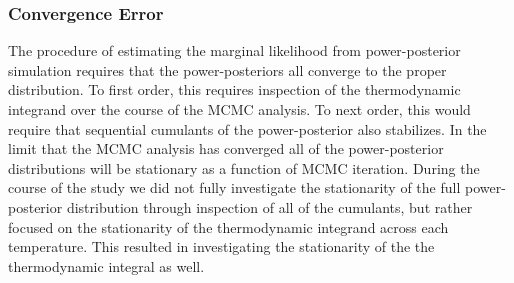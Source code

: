 \subsubsection{Convergence Error}
The procedure of estimating the marginal likelihood from power-posterior simulation requires that the power-posteriors all converge to the proper distribution. To first order, this requires inspection of the thermodynamic integrand over the course of the MCMC analysis. To next order, this would require that sequential cumulants of the power-posterior also stabilizes. In the limit that the MCMC analysis has converged all of the power-posterior distributions will be stationary as a function of MCMC iteration. During the course of the study we did not fully investigate the stationarity of the full power-posterior distribution through inspection of all of the cumulants, but rather focused on the stationarity of the thermodynamic integrand across each temperature. This resulted in investigating the stationarity of the the thermodynamic integral as well.

